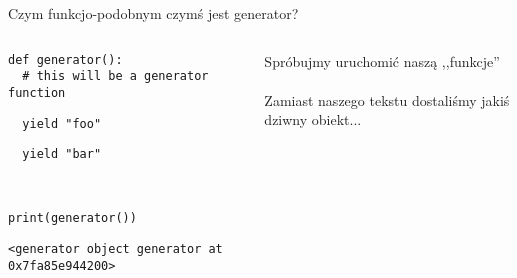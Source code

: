 \documentclass[aspectratio=169]{beamer}
\begin{document}
\begin{frame}[fragile]{Czym funkcjo-podobnym czymś jest generator?}
  \begin{columns}
    \begin{column}{0.5\textwidth}
      \scriptsize
      \begin{verbatim}
def generator():
  # this will be a generator function
      \end{verbatim}
      \begin{verbatim}
  yield "foo"
      \end{verbatim}
      \begin{verbatim}
  yield "bar"
      \end{verbatim}
      \begin{verbatim}


print(generator())
      \end{verbatim}

      \texttt{<generator object generator at 0x7fa85e944200>}
    \end{column}
    \begin{column}{0.5\textwidth}
      Spróbujmy uruchomić naszą ,,funkcje''\\~\\

      Zamiast naszego tekstu dostaliśmy jakiś dziwny obiekt...
      
    \end{column}
  \end{columns}
\end{frame}
\end{document}
